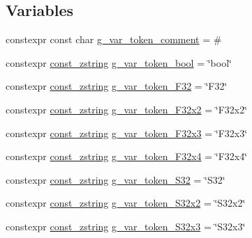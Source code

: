\subsection*{Variables}
\begin{DoxyCompactItemize}
\item 
constexpr const char \mbox{\hyperlink{namespacemage_1_1loader_a51fd34b486dfe1d203f7c7b897b2fd2c}{g\+\_\+var\+\_\+token\+\_\+comment}} = \textquotesingle{}\#\textquotesingle{}
\item 
constexpr \mbox{\hyperlink{namespacemage_abfd9206dc607ceb5d13ec68bf075a5c0}{const\+\_\+zstring}} \mbox{\hyperlink{namespacemage_1_1loader_a0457a884e6f6cd7228676907e829575b}{g\+\_\+var\+\_\+token\+\_\+bool}} = \char`\"{}bool\char`\"{}
\item 
constexpr \mbox{\hyperlink{namespacemage_abfd9206dc607ceb5d13ec68bf075a5c0}{const\+\_\+zstring}} \mbox{\hyperlink{namespacemage_1_1loader_a272ec3ac3b8043565ede2918b613e142}{g\+\_\+var\+\_\+token\+\_\+\+F32}} = \char`\"{}F32\char`\"{}
\item 
constexpr \mbox{\hyperlink{namespacemage_abfd9206dc607ceb5d13ec68bf075a5c0}{const\+\_\+zstring}} \mbox{\hyperlink{namespacemage_1_1loader_acfe0065cb85b25638fd87e4cb4b56960}{g\+\_\+var\+\_\+token\+\_\+\+F32x2}} = \char`\"{}F32x2\char`\"{}
\item 
constexpr \mbox{\hyperlink{namespacemage_abfd9206dc607ceb5d13ec68bf075a5c0}{const\+\_\+zstring}} \mbox{\hyperlink{namespacemage_1_1loader_a309c4e95564d189267b639982f933d9d}{g\+\_\+var\+\_\+token\+\_\+\+F32x3}} = \char`\"{}F32x3\char`\"{}
\item 
constexpr \mbox{\hyperlink{namespacemage_abfd9206dc607ceb5d13ec68bf075a5c0}{const\+\_\+zstring}} \mbox{\hyperlink{namespacemage_1_1loader_aa30d9770e77697fe49b67d4fd4d36be5}{g\+\_\+var\+\_\+token\+\_\+\+F32x4}} = \char`\"{}F32x4\char`\"{}
\item 
constexpr \mbox{\hyperlink{namespacemage_abfd9206dc607ceb5d13ec68bf075a5c0}{const\+\_\+zstring}} \mbox{\hyperlink{namespacemage_1_1loader_a75eebbbfc199cf7c56c9fd3aca78daf6}{g\+\_\+var\+\_\+token\+\_\+\+S32}} = \char`\"{}S32\char`\"{}
\item 
constexpr \mbox{\hyperlink{namespacemage_abfd9206dc607ceb5d13ec68bf075a5c0}{const\+\_\+zstring}} \mbox{\hyperlink{namespacemage_1_1loader_a299bf95167881649611ba55fd3226fbd}{g\+\_\+var\+\_\+token\+\_\+\+S32x2}} = \char`\"{}S32x2\char`\"{}
\item 
constexpr \mbox{\hyperlink{namespacemage_abfd9206dc607ceb5d13ec68bf075a5c0}{const\+\_\+zstring}} \mbox{\hyperlink{namespacemage_1_1loader_ace186c82d08eb904df8f4ad54cc36e47}{g\+\_\+var\+\_\+token\+\_\+\+S32x3}} = \char`\"{}S32x3\char`\"{}

\end{DoxyCompactItemize}
